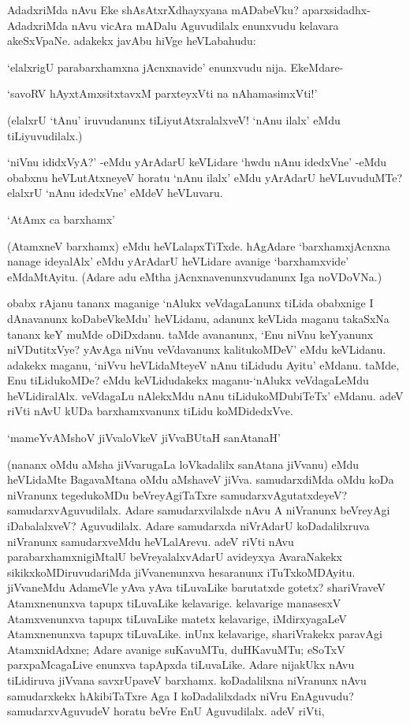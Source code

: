 AdadxriMda nAvu Eke shAsAtxrXdhayxyana mADabeVku? aparxsidadhx-AdadxriMda nAvu vicAra mADalu Aguvudilalx enunxvudu kelavara akeSxVpaNe. adakekx javAbu hiVge heVLabahudu:

`elalxrigU parabarxhamxna jAcnxnavide' enunxvudu nija. EkeMdare-

\begin{shloka}
`savoRV hAyxtAmxsitxtavxM parxteyxVti na nAhamasimxVti!'
\end{shloka}

(elalxrU `tAnu' iruvudanunx tiLiyutAtxralalxveV! `nAnu ilalx' eMdu tiLiyuvudilalx.)

`niVnu ididxVyA?' -eMdu yArAdarU keVLidare `hwdu nAnu idedxVne' -eMdu obabxnu heVLutAtxneyeV horatu `nAnu ilalx' eMdu yArAdarU heVLuvuduMTe? elalxrU `nAnu idedxVne' eMdeV heVLuvaru.

\begin{shloka}
`AtAmx ca barxhamx'
\end{shloka}

(AtamxneV barxhamx) eMdu heVLalapxTiTxde. hAgAdare `barxhamxjAcnxna nanage ideyalAlx' eMdu yArAdarU heVLidare avanige `barxhamxvide' eMdaMtAyitu. (Adare adu eMtha jAcnxnavenunxvudanunx Iga noVDoVNa.)

obabx rAjanu tananx maganige `nAlukx veVdagaLanunx tiLida obabxnige I dAnavanunx koDabeVkeMdu' heVLidanu, adanunx keVLida maganu takaSxNa tananx keY muMde oDiDxdanu. taMde avananunx, `Enu niVnu keYyanunx niVDutitxVye? yAvAga niVnu veVdavanunx kalitukoMDeV' eMdu keVLidanu. adakekx maganu, `niVvu heVLidaMteyeV nAnu tiLidudu Ayitu' eMdanu. taMde, Enu tiLidukoMDe? eMdu keVLidudakekx maganu-`nAlukx veVdagaLeMdu heVLidiralAlx. veVdagaLu nAlekxMdu nAnu tiLidukoMDubiTeTx' eMdanu. adeV riVti nAvU kUDa barxhamxvanunx tiLidu koMDidedxVve.

\begin{shloka}
`mameYvAMshoV jiVvaloVkeV jiVvaBUtaH sanAtanaH'
\end{shloka}

(nananx oMdu aMsha jiVvarugaLa loVkadalilx sanAtana jiVvanu) eMdu heVLidaMte BagavaMtana oMdu aMshaveV jiVva. samudarxdiMda oMdu koDa niVranunx tegedukoMDu beVreyAgiTaTxre samudarxvAgutatxdeyeV? samudarxvAguvudilalx. Adare samudarxvilalxde nAvu A niVranunx beVreyAgi iDabalalxveV? Aguvudilalx. Adare samudarxda niVrAdarU koDadalilxruva niVranunx samudarxveMdu heVLalArevu. adeV riVti nAvu parabarxhamxnigiMtalU beVreyalalxvAdarU avideyxya AvaraNakekx sikikxkoMDiruvudariMda jiVvanenunxva hesaranunx iTuTxkoMDAyitu. jiVvaneMdu AdameVle yAva yAva tiLuvaLike barutatxde gotetx? shariVraveV Atamxnenunxva tapupx tiLuvaLike kelavarige. kelavarige manasesxV Atamxvenunxva tapupx tiLuvaLike matetx kelavarige, iMdirxyagaLeV Atamxnenunxva tapupx tiLuvaLike. inUnx kelavarige, shariVrakekx paravAgi AtamxnidAdxne; Adare avanige suKavuMTu, duHKavuMTu; eSoTxV parxpaMcagaLive enunxva tapApxda tiLuvaLike. Adare nijakUkx nAvu tiLidiruva jiVvana savxrUpaveV barxhamx. koDadalilxna niVranunx nAvu samudarxkekx hAkibiTaTxre Aga I koDadalilxdadx niVru EnAguvudu? samudarxvAguvudeV horatu beVre EnU Aguvudilalx. adeV riVti,

